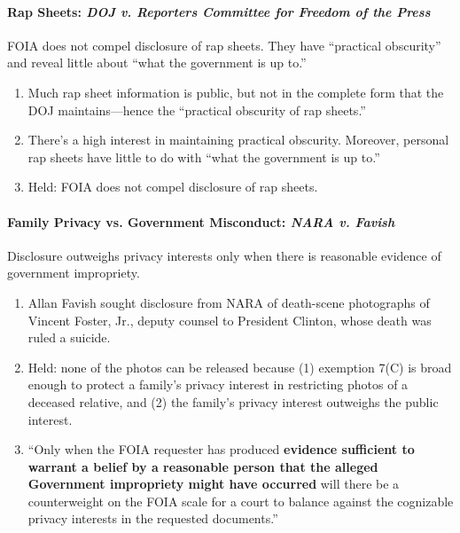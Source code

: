 \paragraph{Rap Sheets: \emph{DOJ v. Reporters Committee for Freedom of the 
Press}}

FOIA does not compel disclosure of rap sheets. They have ``practical 
obscurity'' and reveal little about ``what the government is up to.''

\begin{enumerate}
    \item Much rap sheet information is public, but not in the complete form 
    that the DOJ maintains---hence the ``practical obscurity of rap sheets.''
    \item There's a high interest in maintaining practical obscurity. 
    Moreover, personal rap sheets have little to do with ``what the government 
    is up to.''
    \item Held: FOIA does not compel disclosure of rap sheets.
\end{enumerate}

\paragraph{Family Privacy vs. Government Misconduct: \emph{NARA v. Favish}}

Disclosure outweighs privacy interests only when there is reasonable evidence 
of government impropriety.

\begin{enumerate}
    \item Allan Favish sought disclosure from NARA of death-scene photographs 
    of Vincent Foster, Jr., deputy counsel to President Clinton, whose death 
    was ruled a suicide.
    \item Held: none of the photos can be released because (1) exemption 7(C) 
    is broad enough to protect a family's privacy interest in restricting 
    photos of a deceased relative, and (2) the family's privacy interest 
    outweighs the public interest.
    \item ``Only when the FOIA requester has produced \textbf{evidence 
    sufficient to warrant a belief by a reasonable person that the alleged 
    Government impropriety might have occurred} will there be a counterweight 
    on the FOIA scale for a court to balance against the cognizable privacy 
    interests in the requested documents.''
\end{enumerate}

